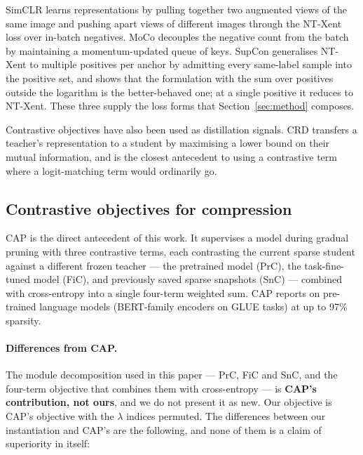 SimCLR \citep{chen2020simclr} learns representations by pulling together two
augmented views of the same image and pushing apart views of different images
through the NT-Xent loss over in-batch negatives. MoCo \citep{he2020moco}
decouples the negative count from the batch by maintaining a momentum-updated
queue of keys. SupCon \citep{khosla2020supcon} generalises NT-Xent to multiple
positives per anchor by admitting every same-label sample into the positive set,
and shows that the formulation with the sum over positives outside the logarithm
is the better-behaved one; at a single positive it reduces to NT-Xent. These
three supply the loss forms that Section~\ref{sec:method} composes.

Contrastive objectives have also been used as distillation signals. CRD
\citep{tian2020crd} transfers a teacher's representation to a student by
maximising a lower bound on their mutual information, and is the closest
antecedent to using a contrastive term where a logit-matching term
\citep{hinton2015distilling} would ordinarily go.

\subsection{Contrastive objectives for compression}

CAP \citep{xu2022cap} is the direct antecedent of this work. It supervises a
model during gradual pruning with three contrastive terms, each contrasting the
current sparse student against a different frozen teacher --- the pretrained model
(PrC), the task-fine-tuned model (FiC), and previously saved sparse snapshots
(SnC) --- combined with cross-entropy into a single four-term weighted sum. CAP
reports on pre-trained language models (BERT-family encoders on GLUE tasks) at up
to 97\% sparsity.

\paragraph{Differences from CAP.}
The module decomposition used in this paper --- PrC, FiC and SnC, and the
four-term objective that combines them with cross-entropy --- is
\textbf{CAP's contribution, not ours}, and we do not present it as new. Our
objective is CAP's objective with the $\lambda$ indices permuted. The differences
between our instantiation and CAP's are the following, and none of them is a
claim of superiority in itself:

